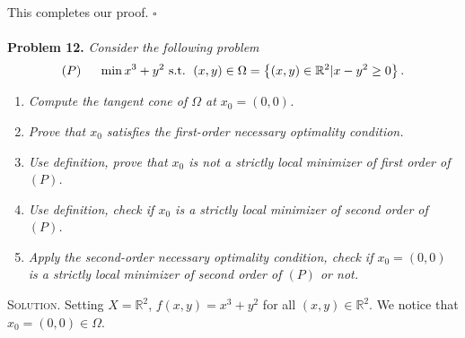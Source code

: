 \documentclass[a4paper]{article}
\numberwithin{equation}{section}
\begin{document}
This completes our proof. \hfill $\square$\\
\\
\textbf{Problem 12.} \textit{Consider the following problem}
\begin{align}
\left( P \right)\hspace{0.5cm}\min {x^3} + {y^2}\mbox{ s.t. } \left( {x,y} \right) \in \Omega  = \left\{ {\left( {x,y} \right) \in {\mathbb{R}^2}|x - {y^2} \ge 0} \right\}.
\end{align}
\begin{enumerate}
\item \textit{Compute the tangent cone of $\Omega$ at $x_0=\left(0,0\right)$.}
\item \textit{Prove that $x_0$ satisfies the first-order necessary optimality condition.}
\item \textit{Use definition, prove that $x_0$ is not a strictly local minimizer of first order of $\left(P\right)$.}
\item \textit{Use definition, check if $x_0$ is a strictly local minimizer of second order of $\left(P\right)$.}
\item \textit{Apply the second-order necessary optimality condition, check if $x_0=\left(0,0\right)$ is a strictly local minimizer of second order of $\left(P\right)$ or not.}
\end{enumerate}
\textsc{Solution.} Setting $X=\mathbb{R}^2$, $f\left(x,y\right)=x^3+y^2$ for all $\left(x,y\right)\in \mathbb{R}^2$. We notice that $x_0=\left(0,0\right)\in \Omega$.
\end{document}
